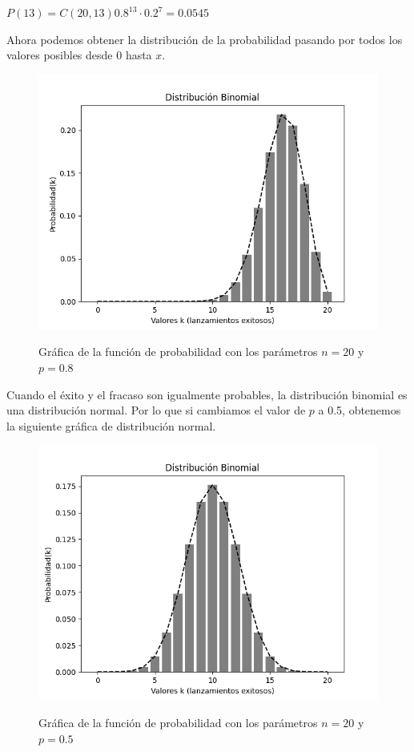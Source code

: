 $P(13) = C(20,13) 0.8^{13} \cdot 0.2^{7} = 0.0545$

Ahora podemos obtener la distribución de la probabilidad pasando por todos los
valores posibles desde 0 hasta $x$.

\begin{figure}[h!]
\includegraphics[scale=0.9]{../slides/figures/binomial_distribution.png}
\label{fig:binomial_distribution}
\caption{Gráfica de la función de probabilidad con los parámetros $n=20$ y $p=0.8$}
\end{figure}

Cuando el éxito y el fracaso son igualmente probables, la distribución binomial
es una distribución normal. Por lo que si cambiamos el valor de $p$ a 0.5,
obtenemos la siguiente gráfica de distribución normal.

\begin{figure}[h!]
    \includegraphics[scale=0.9]{../slides/figures/binomial_distribution_normal.png}
    \label{fig:normal_binomial_distribution}
    \caption{Gráfica de la función de probabilidad con los parámetros $n=20$ y $p=0.5$}
\end{figure}
